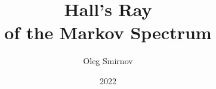 \documentclass{beamer}
\title[Hall's Ray]{Hall's Ray\\of the Markov Spectrum}
\author{Oleg Smirnov}
\institute{Higher School of Economics}
\date{2022}
\begin{document}
\frame{\titlepage}



\end{document}
